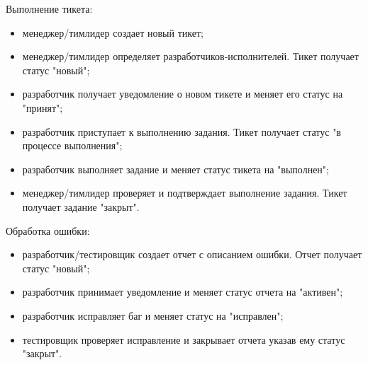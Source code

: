 			Выполнение тикета:
			\begin{itemize}
				\item менеджер/тимлидер создает новый тикет;
				\item менеджер/тимлидер определяет разработчиков-исполнителей. Тикет получает статус "новый";
				\item разработчик получает уведомление о новом тикете и меняет его статус на "принят";
				\item разработчик приступает к выполнению задания. Тикет получает статус "в процессе выполнения";
				\item разработчик выполняет задание и меняет статус тикета на "выполнен";
				\item менеджер/тимлидер проверяет и подтверждает выполнение задания. Тикет получает задание "закрыт".
			\end{itemize}
			
			Обработка ошибки:
			\begin{itemize}
				\item разработчик/тестировщик создает отчет с описанием ошибки. Отчет получает статус "новый";
				\item разработчик принимает уведомление и меняет статус отчета на "активен";
				\item разработчик исправляет баг и меняет статус на "исправлен";
				\item тестировщик проверяет исправление и закрывает отчета указав ему статус "закрыт".
			\end{itemize}